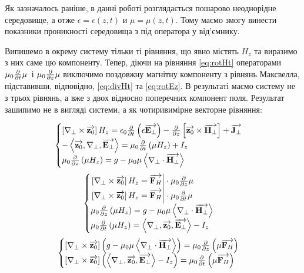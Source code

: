 Як зазначалось раніше, в данні роботі розглядається пошарово неоднорідне 
середовище, а отже $ \epsilon = \epsilon(z,t) $ и $ \mu = \mu(z,t) $. Тому
маємо змогу винести показники проникності середовища з під оператора у 
від'ємнику.

Випишемо в окрему систему тільки ті рівняння, що явно містять $ H_z $ та 
виразимо з них саме цю компоненту. Тепер, діючи на рівняння \eqref{eq:rotHt} 
операторами $ \mu_0 \frac{\partial }{\partial t} \mu $ і $ \mu_0 \frac{\partial }{\partial z} \mu $ 
виключимо поздовжну магнітну компоненту з рівнянь Максвелла, підставивши, 
відповідно, \eqref{eq:divHt} та \eqref{eq:rotEz}. В результаті маємо систему 
не з трьох рівнянь, а вже з двох відносно поперечних компонент поля. 
Результат зашипимо не в вигляді системи, а як чотиривимірне векторне рівняння:

\textcolor{blue}{ \begin{equation*} \begin{aligned}
\begin{cases} 
\left[ \nabla_\perp \times \overrightarrow{\mathbf z_0} \right] H_z =
\epsilon_0 \frac{\partial }{\partial t} \left( \epsilon \overrightarrow{\mathbf E_\perp} \right) -
\frac{\partial }{\partial z} \left[ \overrightarrow{\mathbf z_0} \times \overrightarrow{\mathbf H_\perp} \right] + \overrightarrow{\mathbf J_\perp} \\
- \left< \overrightarrow{\mathbf z_0} , \nabla_\perp , \overrightarrow{\mathbf E_\perp} \right> =
\mu_0 \frac{\partial }{\partial t} \left(\mu H_z \right) + I_z \\ 
\mu_0 \frac{\partial }{\partial z} \left( \mu H_z \right) = 
g - \mu_0 \mu \left< \nabla_\perp \cdot \overrightarrow{\mathbf H_\perp} \right>
\end{cases}
\end{aligned} \end{equation*} }
%
\textcolor{blue}{ \begin{equation*} \begin{aligned}
\begin{cases} 
\left. \left[ \nabla_\perp \times \overrightarrow{\mathbf z_0} \right] H_z = \overrightarrow{\mathbf F_H} 
\right| \cdot \mu_0 \frac{\partial }{\partial z} \mu \\
\left. \left[ \nabla_\perp \times \overrightarrow{\mathbf z_0} \right] H_z = \overrightarrow{\mathbf F_H} 
\right| \cdot \mu_0 \frac{\partial }{\partial t} \mu \\
\mu_0 \frac{\partial }{\partial z} \left( \mu H_z \right) = 
g - \mu_0 \mu \left< \nabla_\perp \cdot \overrightarrow{\mathbf H_\perp} \right> \\
\mu_0 \frac{\partial }{\partial t} \left(\mu H_z \right) =
\left< \nabla_\perp , \overrightarrow{\mathbf z_0} , \overrightarrow{\mathbf E_\perp} \right> - I_z
\end{cases}
\end{aligned} \end{equation*} }
%
\textcolor{blue}{ \begin{equation*} \begin{aligned}
\begin{cases} 
\left[ \nabla_\perp \times \overrightarrow{\mathbf z_0} \right] \left(
g - \mu_0 \mu \left< \nabla_\perp \cdot \overrightarrow{\mathbf H_\perp} \right> \right) =
\mu_0 \frac{\partial }{\partial z} \left( \mu \overrightarrow{\mathbf F_H} \right) \\
\left[ \nabla_\perp \times \overrightarrow{\mathbf z_0} \right] \left(
\left< \nabla_\perp , \overrightarrow{\mathbf z_0} , \overrightarrow{\mathbf E_\perp} \right> - I_z \right) = 
\mu_0 \frac{\partial }{\partial t} \left( \mu \overrightarrow{\mathbf F_H} \right)
\end{cases}
\end{aligned} \end{equation*} }
